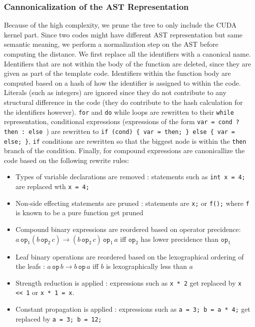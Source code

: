 \documentclass[nocopyrightspace]{sigchi}
\begin{document}
\subsubsection{Cannonicalization of the AST Representation}

Because of the high complexity, we prune the tree to only include the CUDA kernel part.
Since two codes might have different AST representation but same semantic meaning,
we perform a normalization step on the AST before computing the distance.
We first replace all the identifiers with a canonical name. Identifiers that are not within
the body of the function are deleted, since they are given as part of the template code.
Identifiers within the function body are computed based on
a hash of how the identifier is assigned to within the code.
Literals (such as integers) are ignored since they do not contribute to any structural
difference in the code (they do contribute to the hash calculation for the identifiers however).
{\tt for} and {\tt do} while loops are rewritten to their {\tt while} representation,
conditional expressions (expressions of the form {\tt var = cond ? then : else }) are rewritten
to {\tt if (cond) \{ var = then; \} else \{ var = else; \}},
{\tt if} conditions are rewritten so that the biggest node is within the {\tt then} branch
of the condition. Finally, for compound expressions are canonicallize the code based on the
following rewrite rules:

\begin{itemize}
  \item Types of variable declarations are removed : statements such as {\tt int x = 4;}
  are replaced wth {\tt x = 4;}
  \item Non-side effecting statements are pruned : statements are {\tt x;} or {\tt f();} where
  {\tt f} is known to be a pure function get pruned
  \item Compound binary expressions are reordered based on operator precidence:
  $a \, \mathtt{op}_1  (b \, \mathtt{op}_2 \, c) \rightarrow (b \, \mathtt{op}_2 \, c) \, \mathtt{op}_1 \, a$
  iff $\mathtt{op}_2$ has lower precidence than $\mathtt{op}_1$
  \item Leaf binary operations are reordered based on the lexographical ordering
  of the leafs :
  $a \, \mathtt{op} \, b \rightarrow b \, \mathtt{op} \, a$ iff $b$ is lexographically less than $a$
  \item Strength reduction is applied : expressions such as {\tt x * 2} get replaced by {\tt x << 1} or
  {\tt x * 1 = x}.
  \item Constant propagation is applied : expressions such as {\tt a = 3; b = a * 4;} get replaced
  by {\tt a = 3; b = 12;}
\end{itemize}
\end{document}
